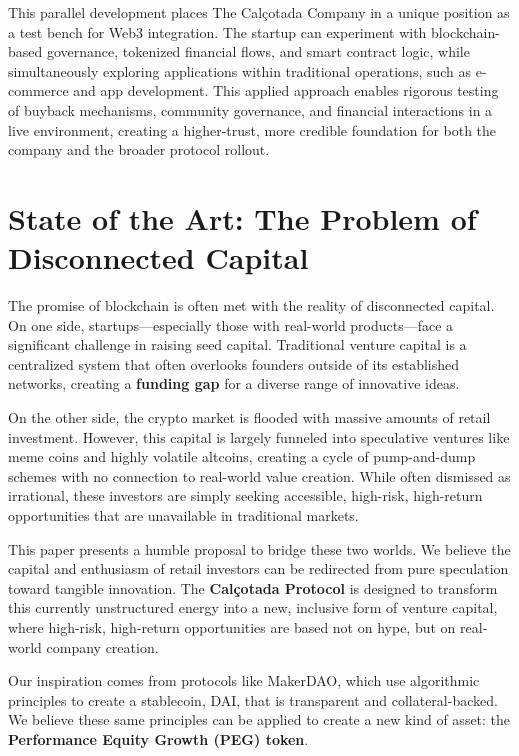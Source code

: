 \documentclass[conference]{IEEEtran}
\begin{document}
This parallel development places The Calçotada Company in a unique position as a test bench for Web3 integration. The startup can experiment with blockchain-based governance, tokenized financial flows, and smart contract logic, while simultaneously exploring applications within traditional operations, such as e-commerce and app development. This applied approach enables rigorous testing of buyback mechanisms, community governance, and financial interactions in a live environment, creating a higher-trust, more credible foundation for both the company and the broader protocol rollout.


\section{State of the Art: The Problem of Disconnected Capital}

The promise of blockchain is often met with the reality of disconnected capital. On one side, startups—especially those with real-world products—face a significant challenge in raising seed capital. Traditional venture capital is a centralized system that often overlooks founders outside of its established networks, creating a \textbf{funding gap} for a diverse range of innovative ideas.

On the other side, the crypto market is flooded with massive amounts of retail investment. However, this capital is largely funneled into speculative ventures like meme coins and highly volatile altcoins, creating a cycle of pump-and-dump schemes with no connection to real-world value creation. While often dismissed as irrational, these investors are simply seeking accessible, high-risk, high-return opportunities that are unavailable in traditional markets.

This paper presents a humble proposal to bridge these two worlds. We believe the capital and enthusiasm of retail investors can be redirected from pure speculation toward tangible innovation. The \textbf{Calçotada Protocol} is designed to transform this currently unstructured energy into a new, inclusive form of venture capital, where high-risk, high-return opportunities are based not on hype, but on real-world company creation.

Our inspiration comes from protocols like MakerDAO, which use algorithmic principles to create a stablecoin, DAI, that is transparent and collateral-backed. We believe these same principles can be applied to create a new kind of asset: the \textbf{Performance Equity Growth (PEG) token}.
\end{document}

